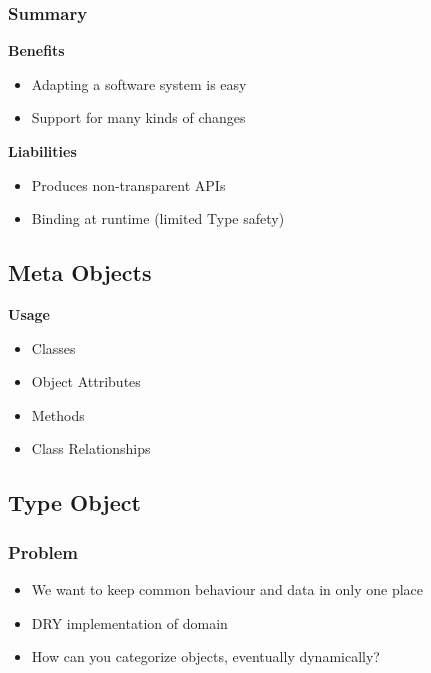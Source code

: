 \subsubsection{Summary}
\textbf{Benefits}
\begin{itemize}
    \item Adapting a software system is easy
    \item Support for many kinds of changes
\end{itemize}
\textbf{Liabilities}
\begin{itemize}
    \item Produces non-transparent APIs
    \item Binding at runtime (limited Type safety)
\end{itemize}

\subsection{Meta Objects}
\textbf{Usage}
\begin{itemize}
    \item Classes
    \item Object Attributes
    \item Methods
    \item Class Relationships
\end{itemize}

\subsection{Type Object}
\subsubsection{Problem}
\begin{itemize}
    \item We want to keep common behaviour and data in only one place
    \item DRY implementation of domain
    \item How can you categorize objects, eventually dynamically?
\end{itemize}

